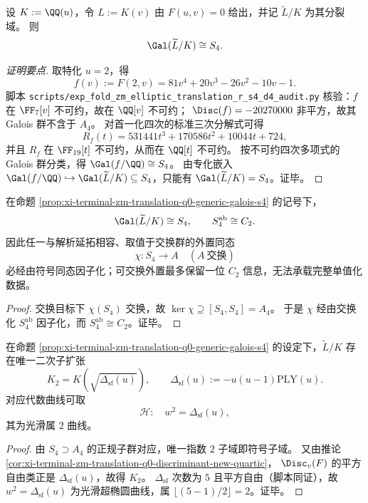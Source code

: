 \begin{proposition}\label{prop:xi-terminal-zm-translation-q0-generic-galois-s4}
设 \(K:=\QQ(u)\)，令 \(L:=K(v)\) 由 \(F(u,v)=0\) 给出，并记 \(\widetilde L/K\) 为其分裂域。
则
\[
\Gal(\widetilde L/K)\cong S_4.
\]
\end{proposition}
\begin{proof}[证明要点]
取特化 \(u=2\)，得
\[
f(v):=F(2,v)=81v^4+20v^3-26v^2-10v-1.
\]
脚本 \texttt{scripts/exp\_fold\_zm\_elliptic\_translation\_r\_s4\_d4\_audit.py}
核验：\(f\) 在 \(\FF_7[v]\) 不可约，故在 \(\QQ[v]\) 不可约；
\(\Disc(f)=-20270000\) 非平方，故其 Galois 群不含于 \(A_4\)。
对首一化四次的标准三次分解式可得
\[
R_f(t)=531441t^3+170586t^2+10044t+724,
\]
并且 \(R_f\) 在 \(\FF_{19}[t]\) 不可约，从而在 \(\QQ[t]\) 不可约。
按不可约四次多项式的 Galois 群分类，得 \(\Gal(f/\QQ)\cong S_4\)。
由专化嵌入 \(\Gal(f/\QQ)\hookrightarrow \Gal(\widetilde L/K)\subseteq S_4\)，只能有
\(\Gal(\widetilde L/K)=S_4\)。证毕。
\end{proof}

\begin{theorem}[交换型外置仅保留符号位]\label{thm:xi-terminal-zm-translation-q0-abelian-register-limit}
在命题 \ref{prop:xi-terminal-zm-translation-q0-generic-galois-s4} 的记号下，
\[
\Gal(\widetilde L/K)\cong S_4,\qquad S_4^{\mathrm{ab}}\cong C_2.
\]
因此任一与解析延拓相容、取值于交换群的外置同态
\[
\chi:S_4\longrightarrow A\quad(A\ \text{交换})
\]
必经由符号同态因子化；可交换外置最多保留一位 \(C_2\) 信息，无法承载完整单值化数据。
\end{theorem}
\begin{proof}
交换目标下 \(\chi(S_4)\) 交换，故 \(\ker\chi\supseteq [S_4,S_4]=A_4\)。
于是 \(\chi\) 经由交换化 \(S_4^{\mathrm{ab}}\) 因子化，而 \(S_4^{\mathrm{ab}}\cong C_2\)。证毕。
\end{proof}

\begin{corollary}\label{cor:xi-terminal-zm-translation-q0-sign-quadratic-subfield}
在命题 \ref{prop:xi-terminal-zm-translation-q0-generic-galois-s4} 的设定下，\(\widetilde L/K\) 存在唯一二次子扩张
\[
K_2
=K\!\left(\sqrt{\Delta_{\mathrm{sf}}(u)}\right),
\qquad
\Delta_{\mathrm{sf}}(u):=-u(u-1)\mathrm{PLY}(u).
\]
对应代数曲线可取
\[
\mathcal H:\quad w^2=\Delta_{\mathrm{sf}}(u),
\]
其为光滑属 \(2\) 曲线。
\end{corollary}
\begin{proof}
由 \(S_4\supset A_4\) 的正规子群对应，唯一指数 \(2\) 子域即符号子域。
又由推论 \ref{cor:xi-terminal-zm-translation-q0-discriminant-new-quartic}，
\(\Disc_v(F)\) 的平方自由类正是 \(\Delta_{\mathrm{sf}}(u)\)，故得 \(K_2\)。
\(\Delta_{\mathrm{sf}}\) 次数为 \(5\) 且平方自由（脚本同证），故 \(w^2=\Delta_{\mathrm{sf}}(u)\) 为光滑超椭圆曲线，属
\(\lfloor(5-1)/2\rfloor=2\)。证毕。
\end{proof}

